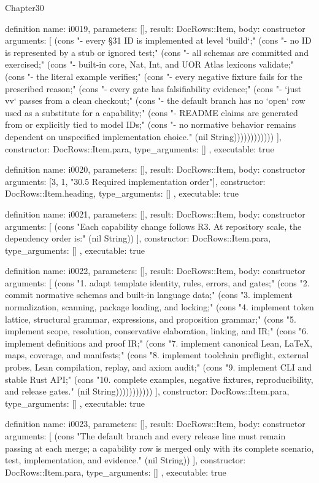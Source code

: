 \begin{lexlean}{Chapter30}
\begin{semanticmodule}
definition{
  name: i0019,
  parameters: [],
  result: DocRows::Item,
  body: constructor{
    arguments: [
      (cons "- every §31 ID is implemented at level `build`;" (cons "- no ID is represented by a stub or ignored test;" (cons "- all schemas are committed and exercised;" (cons "- built-in core, Nat, Int, and UOR Atlas lexicons validate;" (cons "- the literal example verifies;" (cons "- every negative fixture fails for the prescribed reason;" (cons "- every gate has falsifiability evidence;" (cons "- `just vv` passes from a clean checkout;" (cons "- the default branch has no `open` row used as a substitute for a capability;" (cons "- README claims are generated from or explicitly tied to model IDs;" (cons "- no normative behavior remains dependent on unspecified implementation choice." (nil String))))))))))))
    ],
    constructor: DocRows::Item.para,
    type_arguments: []
  },
  executable: true
}

definition{
  name: i0020,
  parameters: [],
  result: DocRows::Item,
  body: constructor{
    arguments: [3, 1, "30.5 Required implementation order"],
    constructor: DocRows::Item.heading,
    type_arguments: []
  },
  executable: true
}

definition{
  name: i0021,
  parameters: [],
  result: DocRows::Item,
  body: constructor{
    arguments: [
      (cons "Each capability change follows R3. At repository scale, the dependency order is:" (nil String))
    ],
    constructor: DocRows::Item.para,
    type_arguments: []
  },
  executable: true
}

definition{
  name: i0022,
  parameters: [],
  result: DocRows::Item,
  body: constructor{
    arguments: [
      (cons "1. adapt template identity, rules, errors, and gates;" (cons "2. commit normative schemas and built-in language data;" (cons "3. implement normalization, scanning, package loading, and locking;" (cons "4. implement token lattice, structural grammar, expressions, and proposition grammar;" (cons "5. implement scope, resolution, conservative elaboration, linking, and IR;" (cons "6. implement definitions and proof IR;" (cons "7. implement canonical Lean, LaTeX, maps, coverage, and manifests;" (cons "8. implement toolchain preflight, external probes, Lean compilation, replay, and axiom audit;" (cons "9. implement CLI and stable Rust API;" (cons "10. complete examples, negative fixtures, reproducibility, and release gates." (nil String)))))))))))
    ],
    constructor: DocRows::Item.para,
    type_arguments: []
  },
  executable: true
}

definition{
  name: i0023,
  parameters: [],
  result: DocRows::Item,
  body: constructor{
    arguments: [
      (cons "The default branch and every release line must remain passing at each merge; a capability row is merged only with its complete scenario, test, implementation, and evidence." (nil String))
    ],
    constructor: DocRows::Item.para,
    type_arguments: []
  },
  executable: true
}
\end{semanticmodule}
\end{lexlean}
